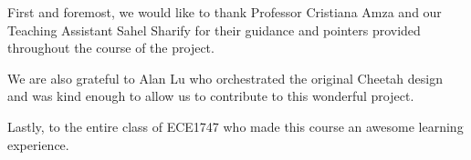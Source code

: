 \documentclass[11pt,journal,compsoc]{IEEEtran}
\begin{document}
First and foremost, we would like to thank Professor Cristiana Amza and our Teaching Assistant Sahel Sharify for their guidance and pointers provided throughout the course of the project. 


We are also grateful to Alan Lu  who orchestrated the original Cheetah design and was kind enough to allow us to contribute to this wonderful project.


Lastly, to the entire class of ECE1747 who made this course an awesome learning experience.

\ifCLASSOPTIONcaptionsoff
  \newpage
\fi




%
%
%




\end{document}
